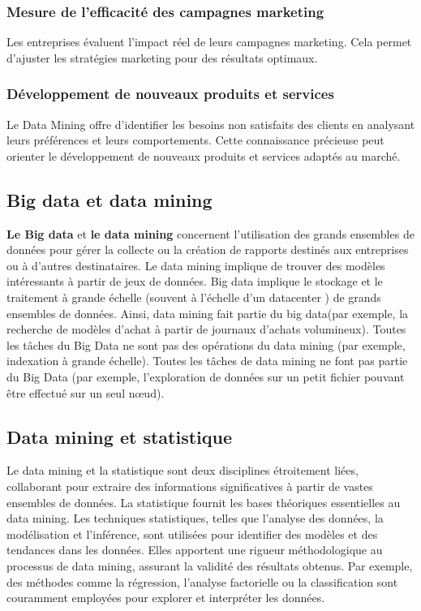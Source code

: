 \documentclass[a4paper,12pt]{article}
\begin{document}
        \subsubsection{Mesure de l’efficacité des campagnes marketing}
            Les entreprises évaluent l’impact réel de leurs campagnes marketing. Cela permet d’ajuster les stratégies marketing pour des résultats optimaux.
        
        \subsubsection{Développement de nouveaux produits et services}
            Le Data Mining offre d’identifier les besoins non satisfaits des clients en analysant leurs préférences et leurs comportements. Cette connaissance précieuse peut orienter le développement de nouveaux produits et services adaptés au marché.


    \subsection{Big data et data mining} 
        \textbf{Le Big data} et \textbf{le data mining} concernent l’utilisation des grands ensembles de données pour gérer la collecte ou la création de rapports destinés aux entreprises ou à d’autres destinataires. Le data mining implique de trouver des modèles intéressants à partir de jeux de données. Big data implique le stockage et le traitement à grande échelle (souvent à l’échelle d’un datacenter ) de grands ensembles de données. Ainsi, data mining fait partie du big data(par exemple, la recherche de modèles d’achat à partir de journaux d’achats volumineux). Toutes les tâches du Big Data ne sont pas des opérations du data mining (par exemple, indexation à grande échelle). Toutes les tâches de data mining ne font pas partie du Big Data (par exemple, l’exploration de données sur un petit fichier pouvant être effectué sur un seul nœud).
        
        
    \subsection{Data mining et statistique} 
        ​Le data mining et la statistique sont deux disciplines étroitement liées, collaborant pour extraire des informations significatives à partir de vastes ensembles de données. 
        La statistique fournit les bases théoriques essentielles au data mining. Les techniques statistiques, telles que l'analyse des données, la modélisation et l'inférence, sont utilisées pour identifier des modèles et des tendances dans les données. Elles apportent une rigueur méthodologique au processus de data mining, assurant la validité des résultats obtenus. Par exemple, des méthodes comme la régression, l'analyse factorielle ou la classification sont couramment employées pour explorer et interpréter les données.
        
\end{document}
